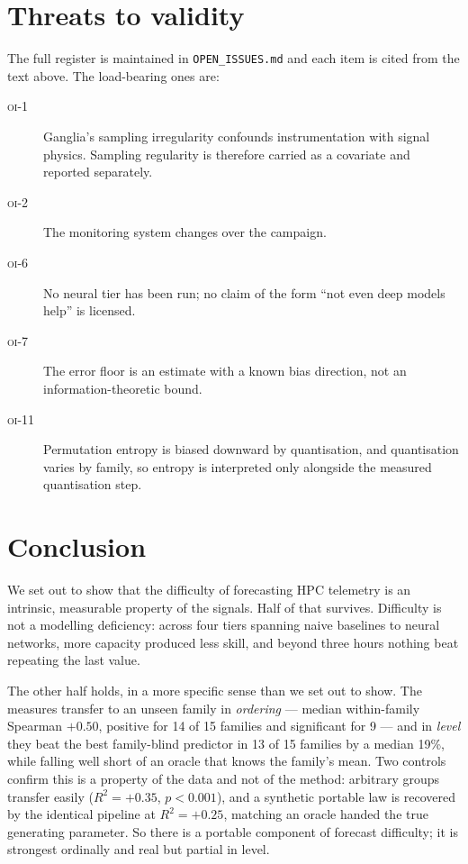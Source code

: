 \documentclass[11pt,a4paper]{article}
\newcommand{\num}[1]{#1}
\newcommand{\oi}[1]{\textsc{oi-#1}}
\begin{document}
\section{Threats to validity}
\label{sec:threats}

The full register is maintained in \texttt{OPEN\_ISSUES.md} and each item is
cited from the text above. The load-bearing ones are:

\begin{description}
  \item[\oi{1}] Ganglia's sampling irregularity confounds instrumentation with
        signal physics. Sampling regularity is therefore carried as a covariate
        and reported separately.
  \item[\oi{2}] The monitoring system changes over the campaign.
  \item[\oi{6}] No neural tier has been run; no claim of the form ``not even
        deep models help'' is licensed.
  \item[\oi{7}] The error floor is an estimate with a known bias direction, not
        an information-theoretic bound.
  \item[\oi{11}] Permutation entropy is biased downward by quantisation, and
        quantisation varies by family, so entropy is interpreted only alongside
        the measured quantisation step.
\end{description}

\section{Conclusion}

We set out to show that the difficulty of forecasting HPC telemetry is an
intrinsic, measurable property of the signals. Half of that survives. Difficulty
is not a modelling deficiency: across four tiers spanning naive baselines to
neural networks, more capacity produced less skill, and beyond three hours
nothing beat repeating the last value.

The other half holds, in a more specific sense than we set out to show. The
measures transfer to an unseen family in \emph{ordering} --- median
within-family Spearman \(+0.50\), positive for \num{14} of \num{15} families
and significant for \num{9} --- and in \emph{level} they beat the best
family-blind predictor in \num{13} of \num{15} families by a median \num{19}\%,
while falling well short of an oracle that knows the family's mean. Two controls
confirm this is a property of the data and not of the method: arbitrary groups
transfer easily (\(R^2 = +0.35\), \(p<0.001\)), and a synthetic portable law is
recovered by the identical pipeline at \(R^2 = +0.25\), matching an oracle
handed the true generating parameter. So there is a portable component of
forecast difficulty; it is strongest ordinally and real but partial in level.
\end{document}
